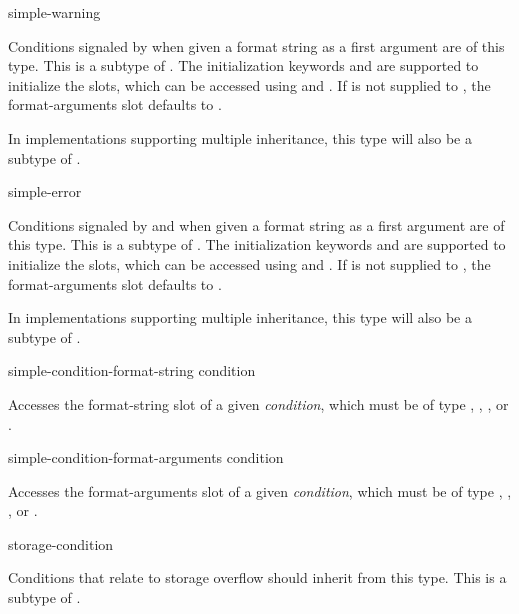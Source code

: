 \begin{defun}[Type]
simple-warning

  Conditions signaled by  when given a format string as a first
  argument are of this type. This is a subtype of .
  The initialization keywords  and  are supported
  to initialize the slots, which can be accessed using
   and .
  If  is not supplied to , the 
  format-arguments slot defaults to .

  In implementations supporting multiple inheritance, this type will also be
  a subtype of .
\end{defun}

\begin{defun}[Type]
simple-error

  Conditions signaled by  and  when given a format string 
  as a first argument are of this type. This is a subtype of .
  The initialization keywords  and  are supported
  to initialize the slots, which can be accessed using
   and .
  If  is not supplied to , the 
  format-arguments slot defaults to .

  In implementations supporting multiple inheritance, this type will also be
  a subtype of .
\end{defun}

\begin{defun}[Function]
simple-condition-format-string condition

  Accesses the format-string slot of a given {\it condition}, which must be
  of type , , , or 
  .
\end{defun}

\begin{defun}[Function]
simple-condition-format-arguments condition

  Accesses the format-arguments slot of a given {\it condition}, which must
  be of type , , , or
  .
\end{defun}


\begin{defun}[Type]
storage-condition

  Conditions that relate to storage overflow should inherit from this type.
  This is a subtype of .
\end{defun}


